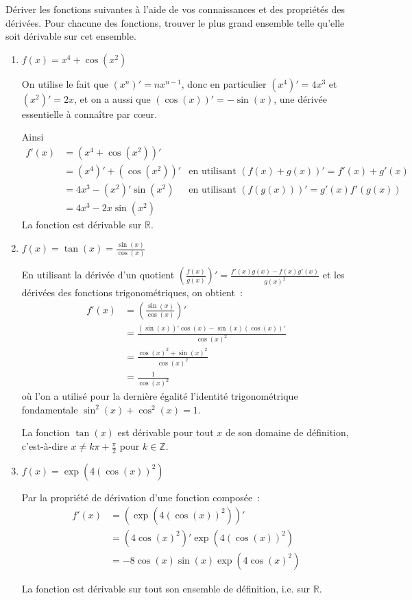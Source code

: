 \begin{exercice}
Dériver les fonctions suivantes à l'aide de vos connaissances et des propriétés des dérivées. Pour chacune des fonctions, trouver le plus grand ensemble telle qu'elle soit dérivable sur cet ensemble.

\begin{enumerate}
    \item $f(x) = x^4 + \cos(x^2)$
    
    On utilise le fait que $(x^n)' = n x^{n-1}$, donc en particulier $(x^4)' = 4x^3$ et $(x^2)' = 2x$, et on a aussi que $(\cos(x))' = - \sin(x)$, une dérivée essentielle à connaître par c\oe{}ur.
    
    Ainsi 
    \begin{align*}
        f'(x) &= \left( x^4 + \cos(x^2) \right)' & \\
              &= \left( x^4 \right)' + \left( \cos(x^2) \right)' &\text{en utilisant } (f(x) + g(x))' = f'(x) + g'(x) \\
              &= 4 x^3 - \left( x^2 \right)' \sin(x^2) &\text{en utilisant } (f(g(x)))' = g'(x) f'(g(x)) \\
              &= 4 x^3 - 2x\sin(x^2) &
    \end{align*}
    La fonction est dérivable sur $\mathbb{R}$.
    
    \item $f(x) = \tan(x) = \frac{\sin(x)}{\cos(x)}$
    
    En utilisant la dérivée d'un quotient $\left(\frac{f(x)}{g(x)}\right)' = \frac{f'(x)g(x) - f(x)g'(x)}{g(x)^2}$ et les dérivées des fonctions trigonométriques, on obtient~:
    \begin{align*}
        f'(x) &= \left( \frac{\sin(x)}{\cos(x)} \right)' \\
              &= \frac{(\sin(x))' \cos(x) - \sin(x) (\cos(x))'}{\cos(x)^2} \\
              &= \frac{\cos(x)^2 + \sin(x)^2}{\cos(x)^2} \\
              &= \frac{1}{\cos(x)^2}
    \end{align*}
    où l'on a utilisé pour la dernière égalité l'identité trigonométrique fondamentale $\sin^2(x) + \cos^2(x) = 1$.

    La fonction $\tan(x)$ est dérivable pour tout $x$ de son domaine de définition, c'est-à-dire $x \neq k\pi + \frac{\pi}{2}$ pour $k \in \mathbb{Z}$.
    
    \item $f(x) = \exp(4 (\cos(x))^2)$
    
    Par la propriété de dérivation d'une fonction composée~:
    \begin{align*}
        f'(x) &= \left( \exp(4 (\cos(x))^2) \right)' \\
        &= \left( 4 \cos(x)^2 \right)' \exp(4 (\cos(x))^2) \\
        &= - 8 \cos(x) \sin(x) \exp(4 \cos(x)^2)
    \end{align*}
    
    La fonction est dérivable sur tout son ensemble de définition, i.e. sur $\mathbb{R}$.
\end{enumerate}
\end{exercice}

